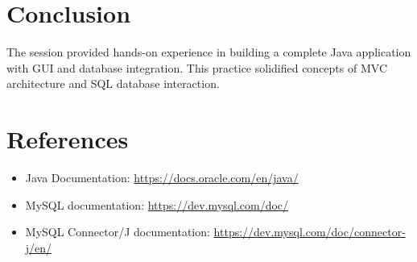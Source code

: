 \documentclass[12pt]{article}
\begin{document}
\section{Conclusion}
The session provided hands-on experience in building a complete Java application with GUI and database integration. This practice solidified concepts of MVC architecture and SQL database interaction.

\section{References}
\begin{itemize}
    \item Java Documentation: \url{https://docs.oracle.com/en/java/}
    \item MySQL documentation: \url{https://dev.mysql.com/doc/}
    \item MySQL Connector/J documentation: \url{https://dev.mysql.com/doc/connector-j/en/}
\end{itemize}
\end{document}
